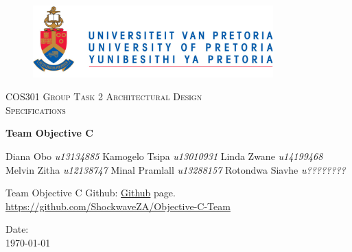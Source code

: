 \begin{titlepage}
  \begin{center}
    \begin{figure}[t]
      \centering
      \includegraphics[width=350px]{logo.PNG}
     \end{figure}
     
     \textsc{\LARGE COS301 Group Task 2 \newline \newline Architectural Design\\[0.5cm] Specifications}
     
     \textbf{\newline Team Objective C} \\
     \begin{flushright} \large
      Diana Obo \emph{u13134885}\newline
      Kamogelo Tsipa \emph{u13010931}\newline
      Linda Zwane \emph{u14199468}\newline
      Melvin Zitha \emph{u12138747}\newline
      Minal Pramlall \emph{u13288157}\newline
      Rotondwa Siavhe \emph{u????????}\newline
       \end{flushright} 
      \vfill %
      
      Team Objective C Github: \href{https://github.com/ShockwaveZA/Objective-C-Team}{Github} page.\\
      \url{https://github.com/ShockwaveZA/Objective-C-Team}
      
      \vfill
      {\large Date:}
      \\
      {\large \today}
     \end{center}
    \end{titlepage}
